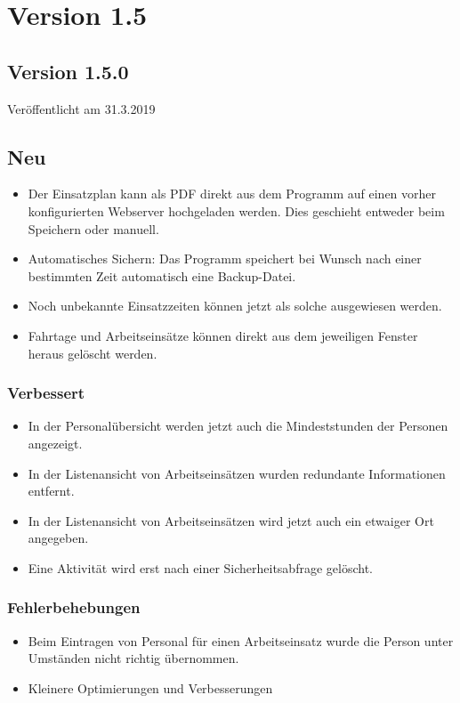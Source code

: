 \section{Version 1.5}\label{versionshistorie:1:5}
\subsection{Version 1.5.0}
\label{version:1:5:0}
Veröffentlicht am 31.3.2019
\subsection{Neu}
\begin{itemize}
  \item
  Der Einsatzplan kann als PDF direkt aus dem Programm auf einen vorher konfigurierten Webserver hochgeladen werden. Dies geschieht entweder beim Speichern oder manuell.
  \item
  Automatisches Sichern: Das Programm speichert bei Wunsch nach einer bestimmten Zeit automatisch eine Backup-Datei.
  \item
  Noch unbekannte Einsatzzeiten können jetzt als solche ausgewiesen werden.
  \item
  Fahrtage und Arbeitseinsätze können direkt aus dem jeweiligen Fenster heraus gelöscht werden.
\end{itemize}

\subsubsection{Verbessert}
\begin{itemize}
  \item
  In der Personalübersicht werden jetzt auch die Mindeststunden der Personen angezeigt.
  \item
  In der Listenansicht von Arbeitseinsätzen wurden redundante Informationen entfernt.
  \item
  In der Listenansicht von Arbeitseinsätzen wird jetzt auch ein etwaiger Ort angegeben.
  \item
  Eine Aktivität wird erst nach einer Sicherheitsabfrage gelöscht.
\end{itemize}

\subsubsection{Fehlerbehebungen}
\begin{itemize}
  \item
  Beim Eintragen von Personal für einen Arbeitseinsatz wurde die Person unter Umständen nicht richtig übernommen.
  \item
  Kleinere Optimierungen und Verbesserungen
\end{itemize}


